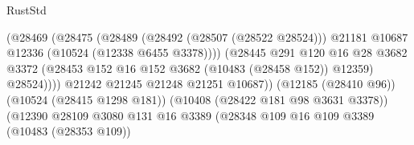 \begin{lexlean}{RustStd}
\begin{coremodule}
                                                    (@28469
                                                      (@28475
                                                        (@28489
                                                          (@28492 (@28507 (@28522 @28524)))
                                                          @21181
                                                          @10687
                                                          @12336
                                                          (@10524 (@12338 @6455 @3378))))
                                                      (@28445
                                                        @291
                                                        @120
                                                        @16
                                                        @28
                                                        @3682
                                                        @3372
                                                        (@28453
                                                          @152
                                                          @16
                                                          @152
                                                          @3682
                                                          (@10483 (@28458 @152))
                                                          @12359)
                                                        @28524))))
                                                @21242
                                                @21245
                                                @21248
                                                @21251
                                                @10687))
                                            (@12185 (@28410 @96))
                                            (@10524 (@28415 @1298 @181))
                                            (@10408 (@28422 @181 @98 @3631 @3378))
                                            (@12390
                                              @28109
                                              @3080
                                              @131
                                              @16
                                              @3389
                                              (@28348
                                                @109
                                                @16
                                                @109
                                                @3389
                                                (@10483 (@28353 @109))

\end{coremodule}
\end{lexlean}
